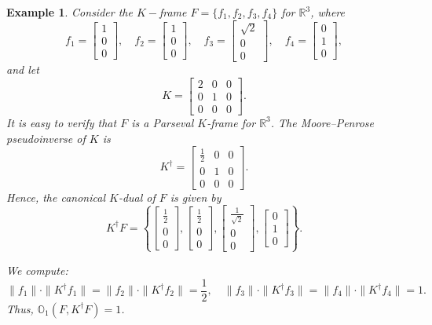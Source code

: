\documentclass[final,1p,times]{elsarticle}
\newtheorem{example}[thm]{Example}
\begin{document}
  \begin{example}
Consider the $K-$frame $F = \{f_1, f_2, f_3, f_4\}$ for $\mathbb{R}^3$, where
\[
f_1 = \begin{bmatrix} 1 \\ 0 \\ 0 \end{bmatrix}, \quad
f_2 = \begin{bmatrix} 1 \\ 0 \\ 0 \end{bmatrix}, \quad
f_3 = \begin{bmatrix} \sqrt{2} \\ 0 \\ 0 \end{bmatrix}, \quad
f_4 = \begin{bmatrix} 0 \\ 1 \\ 0 \end{bmatrix},
\]
and let
\[
K = \begin{bmatrix}
2 & 0 & 0 \\
0 & 1 & 0 \\
0 & 0 & 0
\end{bmatrix}.
\]
It is easy to verify that $F$ is a Parseval $K$-frame for $\mathbb{R}^3$. The Moore–Penrose pseudoinverse of $K$ is
\[
K^\dag = \begin{bmatrix}
\frac{1}{2} & 0 & 0 \\
0 & 1 & 0 \\
0 & 0 & 0
\end{bmatrix}.
\]
Hence, the canonical $K$-dual of $F$ is given by
\[
K^\dag F = \left\{
\begin{bmatrix} \frac{1}{2} \\ 0 \\ 0 \end{bmatrix},
\begin{bmatrix} \frac{1}{2} \\ 0 \\ 0 \end{bmatrix},
\begin{bmatrix} \frac{1}{\sqrt{2}} \\ 0 \\ 0 \end{bmatrix},
\begin{bmatrix} 0 \\ 1 \\ 0 \end{bmatrix}
\right\}.
\]

We compute:
\[
\|f_1\| \cdot \|K^\dag f_1\| = \|f_2\| \cdot \|K^\dag f_2\| = \frac{1}{2}, \quad 
\|f_3\| \cdot \|K^\dag f_3\| = \|f_4\| \cdot \|K^\dag f_4\| = 1.
\]
Thus, $\mathbb{O}_{1}(F, K^\dag F) = 1$.


\end{example}
\end{document}
